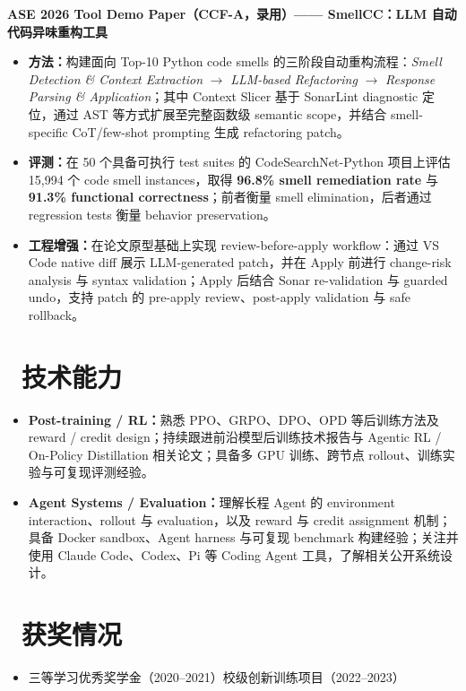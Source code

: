 \documentclass[10pt]{article}
\newcommand{\skillitem}[2]{\textbf{#1：}#2}
\begin{document}
\textbf{ASE 2026 Tool Demo Paper（CCF-A，录用）—— SmellCC：LLM 自动代码异味重构工具}
\begin{itemize}
  \item \textbf{方法：}构建面向 Top-10 Python code smells 的三阶段自动重构流程：\textit{Smell Detection \& Context Extraction} $\rightarrow$ \textit{LLM-based Refactoring} $\rightarrow$ \textit{Response Parsing \& Application}；其中 Context Slicer 基于 SonarLint diagnostic 定位，通过 AST 等方式扩展至完整函数级 semantic scope，并结合 smell-specific CoT/few-shot prompting 生成 refactoring patch。
  \item \textbf{评测：}在 50 个具备可执行 test suites 的 CodeSearchNet-Python 项目上评估 15,994 个 code smell instances，取得 \textbf{96.8\% smell remediation rate} 与 \textbf{91.3\% functional correctness}；前者衡量 smell elimination，后者通过 regression tests 衡量 behavior preservation。
  \item \textbf{工程增强：}在论文原型基础上实现 review-before-apply workflow：通过 VS Code native diff 展示 LLM-generated patch，并在 Apply 前进行 change-risk analysis 与 syntax validation；Apply 后结合 Sonar re-validation 与 guarded undo，支持 patch 的 pre-apply review、post-apply validation 与 safe rollback。
\end{itemize}

\section{\makebox[\widthof{\faWrench}][c]{\color{CVBlue}\faWrench}\ 技术能力}
\begin{itemize}
  \item \skillitem{Post-training / RL}{熟悉 PPO、GRPO、DPO、OPD 等后训练方法及 reward / credit design；持续跟进前沿模型后训练技术报告与 Agentic RL / On-Policy Distillation 相关论文；具备多 GPU 训练、跨节点 rollout、训练实验与可复现评测经验。}
  \item \skillitem{Agent Systems / Evaluation}{理解长程 Agent 的 environment interaction、rollout 与 evaluation，以及 reward 与 credit assignment 机制；具备 Docker sandbox、Agent harness 与可复现 benchmark 构建经验；关注并使用 Claude Code、Codex、Pi 等 Coding Agent 工具，了解相关公开系统设计。}
\end{itemize}

\section{\makebox[\widthof{\faTrophy}][c]{\color{CVBlue}\faTrophy}\ 获奖情况}
\begin{itemize}
  \item 三等学习优秀奖学金（2020--2021）\hfill 校级创新训练项目（2022--2023）
\end{itemize}
\end{document}
